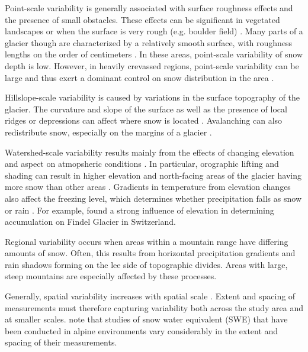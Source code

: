 \documentclass{sfuthesis}
\begin{document}
Point-scale variability is generally associated with surface roughness effects and the presence of small obstacles. These effects can be significant in vegetated landscapes or when the surface is very rough (e.g. boulder field) \citep{Lopez2011}. Many parts of a glacier though are characterized by a relatively smooth surface, with roughness lengths on the order of centimeters \citep{Hock2005}. In these areas, point-scale variability of snow depth is low. However, in heavily crevassed regions, point-scale variability can be large and thus exert a dominant control on snow distribution in the area \citep{McGrath2015}. 

Hillslope-scale variability is caused by variations in the surface topography of the glacier. The curvature and slope of the surface as well as the presence of local ridges or depressions can affect where snow is located \citep{Bloeschl1999, Sold2013}. Avalanching can also redistribute snow, especially on the margins of a glacier \citep{Bloschl1991, Mott2008}. 

Watershed-scale variability results mainly from the effects of changing elevation and aspect on atmopsheric conditions \citep{Clark2011}. In particular, orographic lifting and shading can result in higher elevation and north-facing areas of the glacier having more snow than other areas \citep{Mott2008, Sold2013}. Gradients in temperature from elevation changes also affect the freezing level, which determines whether precipitation falls as snow or rain \citep{Bloschl1991}. For example, \cite{Machguth2006} found a strong influence of elevation in determining accumulation on Findel Glacier in Switzerland.

Regional variability occurs when areas within a mountain range have differing amounts of snow. Often, this results from horizontal precipitation gradients and rain shadows forming on the lee side of topographic divides. Areas with large, steep mountains are especially affected by these processes.

Generally, spatial variability increases with spatial scale \citep{Clark2011}. Extent and spacing of measurements must therefore capturing variability both across the study area and at smaller scales. \cite{Clark2011} note that studies of snow water equivalent (SWE) that have been conducted in alpine environments vary considerably in the extent and spacing of their measurements. 
\end{document}
